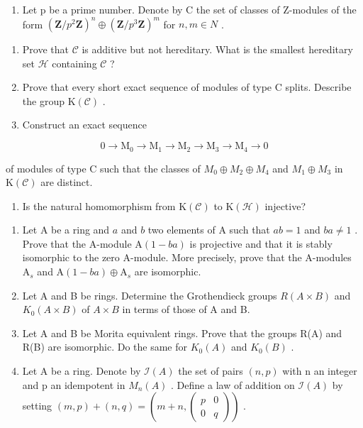 
\begin{enumerate}
\def\labelenumi{\arabic{enumi})}
\tightlist
\item
  Let p be a prime number. Denote by C the set of classes of Z-modules of the form \((\mathbf{Z}/p^{2}\mathbf{Z})^{n} \oplus (\mathbf{Z}/p^{3}\mathbf{Z})^{m}\) for \(n, m \in N\) .
\end{enumerate}

\begin{enumerate}
\def\labelenumi{\alph{enumi})}
\item
  Prove that \(\mathcal{C}\) is additive but not hereditary. What is the smallest hereditary set \(\mathcal{H}\) containing \(\mathcal{C}\) ?
\item
  Prove that every short exact sequence of modules of type C splits. Describe the group \(\mathrm{K}(\mathcal{C})\) .
\item
  Construct an exact sequence
\end{enumerate}

\[
0 \to \mathrm{M} _ {0} \to \mathrm{M} _ {1} \to \mathrm{M} _ {2} \to \mathrm{M} _ {3} \to \mathrm{M} _ {4} \to 0
\]

of modules of type C such that the classes of \(M_{0} \oplus M_{2} \oplus M_{4}\) and \(M_{1} \oplus M_{3}\) in \(\mathrm{K}(\mathcal{C})\) are distinct.

\begin{enumerate}
\def\labelenumi{\alph{enumi})}
\setcounter{enumi}{3}
\tightlist
\item
  Is the natural homomorphism from \(\mathrm{K}(\mathcal{C})\) to \(\mathrm{K}(\mathcal{H})\) injective?
\end{enumerate}

\begin{enumerate}
\def\labelenumi{\arabic{enumi})}
\setcounter{enumi}{1}
\item
  Let \(\mathrm{A}\) be a ring and \(a\) and \(b\) two elements of \(\mathrm{A}\) such that \(ab = 1\) and \(ba \neq 1\) . Prove that the A-module \(\mathrm{A}(1 - ba)\) is projective and that it is stably isomorphic to the zero A-module. More precisely, prove that the A-modules \(\mathrm{A}_s\) and \(\mathrm{A}(1 - ba) \oplus \mathrm{A}_s\) are isomorphic.
\item
  Let A and B be rings. Determine the Grothendieck groups \(R(A \times B)\) and \(K_{0}(A \times B)\) of \(A \times B\) in terms of those of A and B.
\item
  Let A and B be Morita equivalent rings. Prove that the groups R(A) and R(B) are isomorphic. Do the same for \(K_{0}(A)\) and \(K_{0}(B)\) .
\item
  Let A be a ring. Denote by \(\mathcal{I}(A)\) the set of pairs \((n,p)\) with n an integer and p an idempotent in \(M_{n}(A)\) . Define a law of addition on \(\mathcal{I}(A)\) by setting \((m,p)+(n,q)=(m+n,\begin{pmatrix} p & 0 \\ 0 & q \end{pmatrix})\) .
\end{enumerate}

